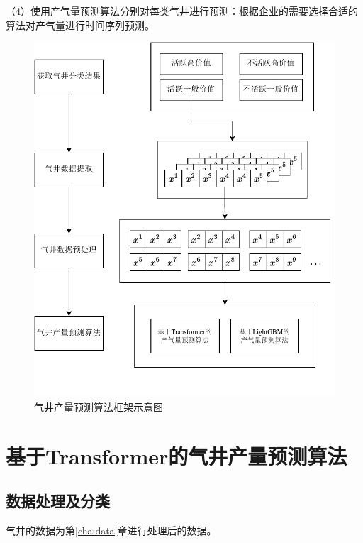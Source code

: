 （4）使用产气量预测算法分别对每类气井进行预测：根据企业的需要选择合适的算法对产气量进行时间序列预测。
\begin{figure}[h]
    \centering
    \includegraphics{figure/第四章框架图.vision.pdf}
    \caption{气井产量预测算法框架示意图}
    \label{fig:TFTprogess}
\end{figure}

\section{基于Transformer的气井产量预测算法}

\subsection{数据处理及分类}
\label{sec:datafoc}
气井的数据为第\ref{cha:data}章进行处理后的数据。

